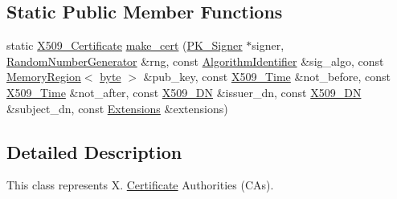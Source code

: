 \subsection*{Static Public Member Functions}
\begin{DoxyCompactItemize}
\item 
static \hyperlink{classBotan_1_1X509__Certificate}{X509\-\_\-\-Certificate} \hyperlink{classBotan_1_1X509__CA_ab1781cae7b0c62d391259ca57a7b60ce}{make\-\_\-cert} (\hyperlink{classBotan_1_1PK__Signer}{P\-K\-\_\-\-Signer} $\ast$signer, \hyperlink{classBotan_1_1RandomNumberGenerator}{Random\-Number\-Generator} \&rng, const \hyperlink{classBotan_1_1AlgorithmIdentifier}{Algorithm\-Identifier} \&sig\-\_\-algo, const \hyperlink{classBotan_1_1MemoryRegion}{Memory\-Region}$<$ \hyperlink{namespaceBotan_a7d793989d801281df48c6b19616b8b84}{byte} $>$ \&pub\-\_\-key, const \hyperlink{classBotan_1_1X509__Time}{X509\-\_\-\-Time} \&not\-\_\-before, const \hyperlink{classBotan_1_1X509__Time}{X509\-\_\-\-Time} \&not\-\_\-after, const \hyperlink{classBotan_1_1X509__DN}{X509\-\_\-\-D\-N} \&issuer\-\_\-dn, const \hyperlink{classBotan_1_1X509__DN}{X509\-\_\-\-D\-N} \&subject\-\_\-dn, const \hyperlink{classBotan_1_1Extensions}{Extensions} \&extensions)
\end{DoxyCompactItemize}


\subsection{Detailed Description}
This class represents X. \hyperlink{classBotan_1_1Certificate}{Certificate} Authorities (C\-As). 

